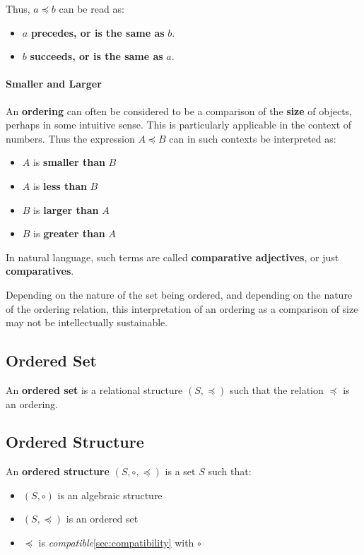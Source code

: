 Thus, $a \preceq b$ can be read as:
\begin{itemize}
\item $a$ \textbf{precedes, or is the same as} $b$.
\item $b$ \textbf{succeeds, or is the same as} $a$.
\end{itemize}

\paragraph{Smaller and Larger}

An \textbf{ordering} can often be considered to be a comparison of the
\textbf{size} of objects, perhaps in some intuitive sense. This is
particularly applicable in the context of numbers. Thus the expression
$A \preceq B$ can in such contexts be interpreted as:
\begin{itemize}
\item $A$ is \textbf{smaller than} $B$
\item $A$ is \textbf{less than} $B$
\item $B$ is \textbf{larger than} $A$
\item $B$ is \textbf{greater than} $A$
\end{itemize}

In natural language, such terms are called \textbf{comparative
  adjectives}, or just \textbf{comparatives}.

Depending on the nature of the set being ordered, and depending on the
nature of the ordering relation, this interpretation of an ordering as
a comparison of size may not be intellectually sustainable.

\subsection{Ordered Set}
\label{sec:ordered-set}

An \textbf{ordered set} is a relational structure $(S, \preceq)$ such
that the relation $\preceq$ is an ordering.


\subsection{Ordered Structure}
\label{sec:ordered-structure}

An \textbf{ordered structure} $(S, \circ, \preceq)$ is a set $S$ such
that:

\begin{itemize}
\item $(S, \circ)$ is an algebraic structure
\item $(S, \preceq)$ is an ordered set
\item $\preceq$ is \textit{compatible}\ref{sec:compatibility} with
  $\circ$
\end{itemize}



